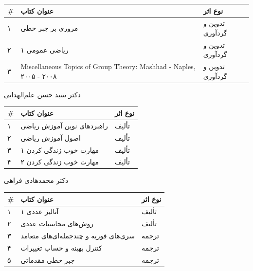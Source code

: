 \documentclass[
  letterpaper,
  DIV=11,
  numbers=noendperiod]{scrreprt}
\newcounter{none} %
\begin{document}
{\def\LTcaptype{none} %
\begin{longtable}[]{@{}
  >{\raggedright\arraybackslash}p{}
  >{\raggedright\arraybackslash}p{}
  >{\raggedright\arraybackslash}p{}@{}}
\toprule\noalign{}
\begin{minipage}[b]{\linewidth}\raggedright
\#
\end{minipage} & \begin{minipage}[b]{\linewidth}\raggedright
عنوان کتاب
\end{minipage} & \begin{minipage}[b]{\linewidth}\raggedright
نوع اثر
\end{minipage} \\
\midrule\noalign{}
\endhead
\bottomrule\noalign{}
\endlastfoot
۱ & مروری بر جبر خطی & تدوین و گردآوری \\
۲ & ریاضی عمومی ۱ & تدوین و گردآوری \\
۳ & Miscellaneous Topics of Group Theory: Mashhad - Naples, ۲۰۰۵ - ۲۰۰۸
& تدوین و گردآوری \\
\end{longtable}
}

دکتر سید حسن علم‌الهدایی

{\def\LTcaptype{none} %
\begin{longtable}[]{@{}lll@{}}
\toprule\noalign{}
\# & عنوان کتاب & نوع اثر \\
\midrule\noalign{}
\endhead
\bottomrule\noalign{}
\endlastfoot
۱ & راهبردهای نوین آموزش ریاضی & تألیف \\
۲ & اصول آموزش ریاضی & تألیف \\
۳ & مهارت خوب زندگی کردن ۱ & تألیف \\
۴ & مهارت خوب زندگی کردن ۲ & تألیف \\
\end{longtable}
}

دکتر محمدهادی فراهی

{\def\LTcaptype{none} %
\begin{longtable}[]{@{}lll@{}}
\toprule\noalign{}
\# & عنوان کتاب & نوع اثر \\
\midrule\noalign{}
\endhead
\bottomrule\noalign{}
\endlastfoot
۱ & آنالیز عددی ۱ & تألیف \\
۲ & روش‌های محاسبات عددی & تألیف \\
۳ & سری‌های فوریه و چندجمله‌ای‌های متعامد & ترجمه \\
۴ & کنترل بهینه و حساب تغییرات & ترجمه \\
۵ & جبر خطی مقدماتی & ترجمه \\
\end{longtable}
}
\end{document}
